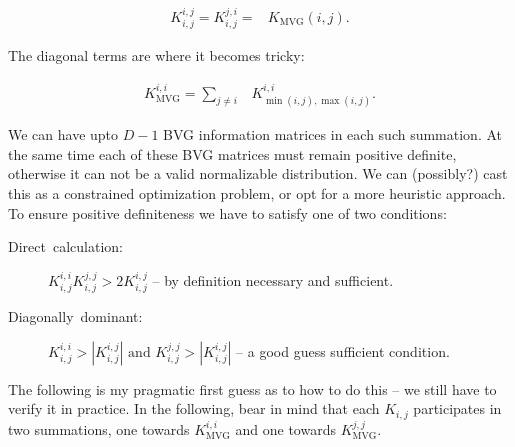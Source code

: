 \begin{align}
K_{i,j}^{i,j}=K_{i,j}^{j,i}= & K_{\mbox{MVG}}(i,j).
\end{align}


The diagonal terms are where it becomes tricky:

\begin{align}
K_{\mbox{MVG}}^{i,i}=\sum_{j\neq i} & K_{\min(i,j),\max(i,j)}^{i,i}.
\end{align}


We can have upto $D-1$ BVG information matrices in each such summation.
At the same time each of these BVG matrices must remain positive definite,
otherwise it can not be a valid normalizable distribution. We can
(possibly?) cast this as a constrained optimization problem, or opt
for a more heuristic approach. To ensure positive definiteness we
have to satisfy one of two conditions\cite[p 255]{Koller2009}:
\begin{description}
\item [{Direct~calculation:}] $K_{i,j}^{i,i}K_{i,j}^{j,j}>2K_{i,j}^{i,j}$
-- by definition necessary and sufficient.
\item [{Diagonally~dominant:}] $K_{i,j}^{i,i}>|K_{i,j}^{i,j}|\mbox{ and }K_{i,j}^{j,j}>|K_{i,j}^{i,j}|$
-- a good guess sufficient condition.
\end{description}
The following is my pragmatic first guess as to how to do this --
we still have to verify it in practice. In the following, bear in
mind that each $K_{i,j}$ participates in two summations, one towards
$K_{\mbox{MVG}}^{i,i}$ and one towards $K_{\mbox{MVG}}^{j,j}$.
